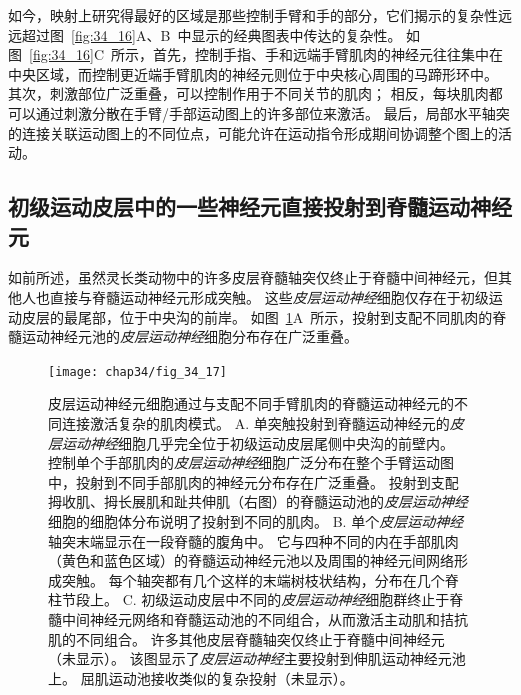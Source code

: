 如今，映射上研究得最好的区域是那些控制手臂和手的部分，它们揭示的复杂性远远超过图~\ref{fig:34_16}A、B~中显示的经典图表中传达的复杂性。
如图~\ref{fig:34_16}C~所示，首先，控制手指、手和远端手臂肌肉的神经元往往集中在中央区域，而控制更近端手臂肌肉的神经元则位于中央核心周围的马蹄形环中。
其次，刺激部位广泛重叠，可以控制作用于不同关节的肌肉；
相反，每块肌肉都可以通过刺激分散在手臂/手部运动图上的许多部位来激活。
最后，局部水平轴突的连接关联运动图上的不同位点，可能允许在运动指令形成期间协调整个图上的活动。



\subsection{初级运动皮层中的一些神经元直接投射到脊髓运动神经元}

如前所述，虽然灵长类动物中的许多皮层脊髓轴突仅终止于脊髓中间神经元，但其他人也直接与脊髓运动神经元形成突触。
这些\textit{皮层运动神经}细胞仅存在于初级运动皮层的最尾部，位于中央沟的前岸。
如图~\ref{fig:34_17}A~所示，投射到支配不同肌肉的脊髓运动神经元池的\textit{皮层运动神经}细胞分布存在广泛重叠。


\begin{figure}[htbp]
	\centering
	\texttt{[image: chap34/fig\_34\_17]}
	\caption{皮层运动神经元细胞通过与支配不同手臂肌肉的脊髓运动神经元的不同连接激活复杂的肌肉模式。
		A. 单突触投射到脊髓运动神经元的\textit{皮层运动神经}细胞几乎完全位于初级运动皮层尾侧中央沟的前壁内。
		控制单个手部肌肉的\textit{皮层运动神经}细胞广泛分布在整个手臂运动图中，投射到不同手部肌肉的神经元分布存在广泛重叠。
		投射到支配拇收肌、拇长展肌和趾共伸肌（右图）的脊髓运动池的\textit{皮层运动神经}细胞的细胞体分布说明了投射到不同的肌肉\cite{rathelot2006muscle}。
		B. 单个\textit{皮层运动神经}轴突末端显示在一段脊髓的腹角中。
		它与四种不同的内在手部肌肉（黄色和蓝色区域）的脊髓运动神经元池以及周围的神经元间网络形成突触。
		每个轴突都有几个这样的末端树枝状结构，分布在几个脊柱节段上\cite{shinoda1981divergent}。
		C. 初级运动皮层中不同的\textit{皮层运动神经}细胞群终止于脊髓中间神经元网络和脊髓运动池的不同组合，从而激活主动肌和拮抗肌的不同组合。
		许多其他皮层脊髓轴突仅终止于脊髓中间神经元（未显示）。
		该图显示了\textit{皮层运动神经}主要投射到伸肌运动神经元池上。
		屈肌运动池接收类似的复杂投射（未显示）\cite{cheney1985patterns}。}
	\label{fig:34_17}
\end{figure}


